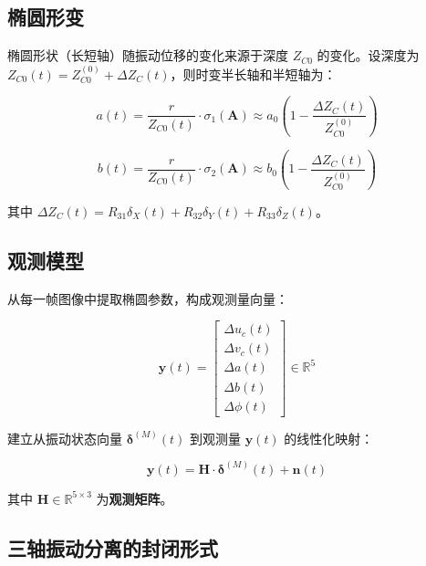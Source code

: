 \documentclass[12pt,a4paper]{article}
\begin{document}
\subsection{椭圆形变}

椭圆形状（长短轴）随振动位移的变化来源于深度 $Z_{C0}$ 的变化。设深度为 $Z_{C0}(t) = Z_{C0}^{(0)} + \Delta Z_C(t)$，则时变半长轴和半短轴为：

\begin{equation}
a(t) = \frac{r}{Z_{C0}(t)} \cdot \sigma_1(\mathbf{A})
\approx a_0 \left(1 - \frac{\Delta Z_C(t)}{Z_{C0}^{(0)}}\right)
\label{eq:time_varying_semi_major}
\end{equation}

\begin{equation}
b(t) = \frac{r}{Z_{C0}(t)} \cdot \sigma_2(\mathbf{A})
\approx b_0 \left(1 - \frac{\Delta Z_C(t)}{Z_{C0}^{(0)}}\right)
\label{eq:time_varying_semi_minor}
\end{equation}

其中 $\Delta Z_C(t) = R_{31}\delta_X(t) + R_{32}\delta_Y(t) + R_{33}\delta_Z(t)$。

\subsection{观测模型}

从每一帧图像中提取椭圆参数，构成观测量向量：

\begin{equation}
\mathbf{y}(t) =
\begin{bmatrix}
\Delta u_c(t) \\[2pt] \Delta v_c(t) \\[2pt]
\Delta a(t) \\[2pt] \Delta b(t) \\[2pt]
\Delta \phi(t)
\end{bmatrix}
\in \mathbb{R}^5
\label{eq:observation_vector}
\end{equation}

建立从振动状态向量 $\boldsymbol{\delta}^{(M)}(t)$ 到观测量 $\mathbf{y}(t)$ 的线性化映射：

\begin{equation}
\mathbf{y}(t) = \mathbf{H} \cdot \boldsymbol{\delta}^{(M)}(t) + \mathbf{n}(t)
\label{eq:observation_model}
\end{equation}

其中 $\mathbf{H} \in \mathbb{R}^{5 \times 3}$ 为\textbf{观测矩阵}。

\subsection{三轴振动分离的封闭形式}
\end{document}
